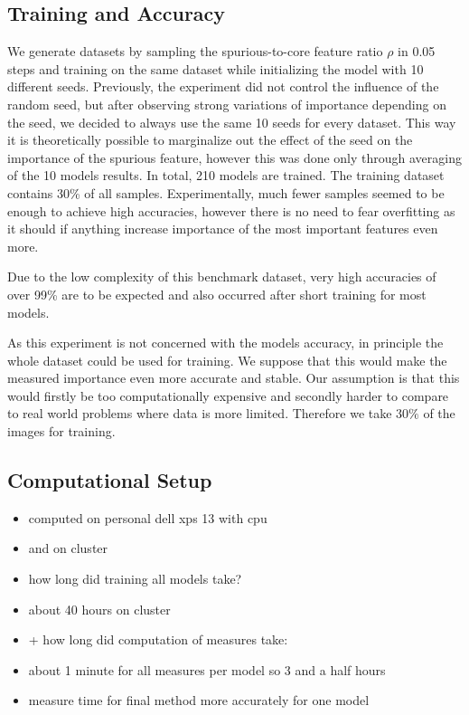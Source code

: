 \subsection{Training and Accuracy}
We generate datasets by sampling the spurious-to-core feature ratio $\rho$ in 0.05 steps and training on the same dataset while initializing the model with 10 different seeds.
Previously, the experiment did not control the influence of the random seed, but after observing strong variations of importance depending on the seed, we decided to always use the same 10 seeds for every dataset. This way it is theoretically possible to marginalize out the effect of the seed on the importance of the spurious feature, however this was done only through averaging of the 10 models results.
In total, 210 models are trained. The training dataset contains 30\% of all samples. Experimentally, much fewer samples seemed to be enough to achieve high accuracies, however there is no need to fear overfitting as it should if anything increase importance of the most important features even more.

Due to the low complexity of this benchmark dataset, very high accuracies of over 99\% are to be expected and also occurred after short training for most models.

As this experiment is not concerned with the models accuracy, in principle the whole dataset could be used for training. We suppose that this would make the measured importance even more accurate and stable. Our assumption is that this would firstly be too computationally expensive and secondly harder to compare to real world problems where data is more limited. Therefore we take $30\%$ of the images for training.

\subsection{Computational Setup}
\label{section:setup}
\begin{itemize}
    \item computed on personal dell xps 13 with cpu
    \item and on cluster 
    \item how long did training all models take?
    \item about 40 hours on cluster
    \item + how long did computation of measures take:
    \item about 1 minute for all measures per model so 3 and a half hours
    \item measure time for final method more accurately for one model 
\end{itemize}

